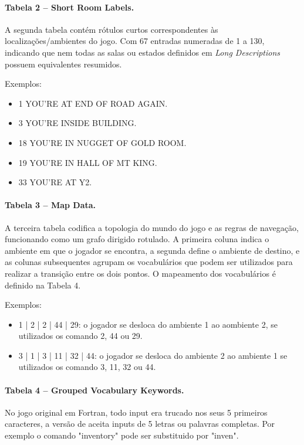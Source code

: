 \documentclass[12pt,a4paper]{article}
\begin{document}
\paragraph{Tabela 2 – Short Room Labels.}  
A segunda tabela contém rótulos curtos correspondentes às localizações/ambientes do jogo. 
Com 67 entradas numeradas de 1 a 130, indicando que nem todas as salas ou estados definidos em \textit{Long Descriptions} possuem equivalentes resumidos.  

Exemplos:  
\begin{itemize}
    \item 1 YOU'RE AT END OF ROAD AGAIN.
    \item 3 YOU'RE INSIDE BUILDING.
    \item 18 YOU'RE IN NUGGET OF GOLD ROOM.
    \item 19 YOU'RE IN HALL OF MT KING.
    \item 33 YOU'RE AT Y2.
\end{itemize}


\paragraph{Tabela 3 – Map Data.}
A terceira tabela codifica a topologia do mundo do jogo e as regras de navegação, funcionando como um grafo dirigido rotulado. A primeira coluna indica o ambiente em que o jogador se encontra, a segunda define o ambiente de destino, e as colunas subsequentes agrupam os vocabulários que podem ser utilizados para realizar a transição entre os dois pontos. O mapeamento dos vocabulários é definido na Tabela 4.  

Exemplos:
\begin{itemize}
  \item 1 | 2 | 2 | 44 | 29: o jogador se desloca do ambiente 1 ao aombiente 2, se utilizados os comando 2, 44 ou 29. 
  \item 3 | 1 | 3 | 11 | 32 | 44: o jogador se desloca do ambiente 2 ao ambiente 1 se utilizados os comando 3, 11, 32 ou 44.
\end{itemize}

\paragraph{Tabela 4 – Grouped Vocabulary Keywords.}
No jogo original em Fortran, todo input era trucado nos seus 5 primeiros caracteres, a versão de \textcite{rhodes_adventure_py} aceita inputs de 5 letras ou palavras completas. Por exemplo o comando "inventory" pode ser substituido por "inven". 
\end{document}
